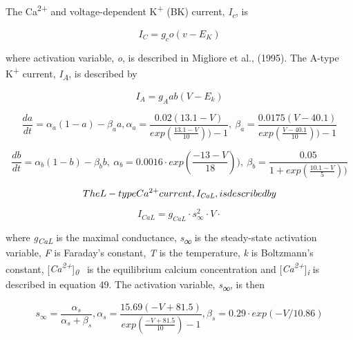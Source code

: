 \documentclass[12pt]{article}
\begin{document}
The Ca\textsuperscript{2+} and voltage-dependent K\textsuperscript{+} (BK) current,
\textit{I}\textit{\textsubscript{c}}, is 


\begin{equation}
I_C=g_co(v-E_K)
\end{equation}


where activation variable, \textit{o}, is described in Migliore et al., (1995). The A-type K\textsuperscript{+} current,
\textit{I}\textit{\textsubscript{A}}, is described by\ \ 


\begin{equation}
I_A=g_A ab (V-E_k)
\end{equation}

\begin{equation}
\frac{da}{dt}=\alpha_a(1-a)-\beta_aa , 
\alpha_a=\frac{0.02(13.1-V)}{exp(\frac{13.1-V}{10}))-1}, \ 
\beta_a=\frac{0.0175(V-40.1)}{exp(\frac{V-40.1}{10}))-1}
\end{equation}

\begin{equation}
\frac{db}{dt}=\alpha_b(1-b)-\beta_bb , \ 
\alpha_b = 0.0016 \cdot exp(\frac{-13-V}{18})), \  \beta_b=\frac{0.05}{1+exp(\frac{10.1-V}{5}))}
\end{equation}

\begin{equation}
The L-type Ca\textsuperscript{2+} current, \textit{I}\textit{\textsubscript{CaL}}, is described by
\end{equation}

\begin{equation}
I_{CaL}=g_{CaL}\cdot s_{\infty }^2\cdot V\cdot
\end{equation}


where \textit{g}\textit{\textsubscript{CaL}} is the maximal conductance, \textit{s}\textsf{\textit{\textsubscript{∞}}}
is the steady-state activation variable, \textit{F} is Faraday’s constant, \textit{T} is the temperature, \textit{k} is
Boltzmann’s constant, [\textit{Ca\textsuperscript{2+}}]\textit{\textsubscript{0}} \ is the
equilibrium calcium concentration and [\textit{Ca}\textit{\textsuperscript{2+}}]\textit{\textsubscript{i}} is
described in equation 49. The activation variable, \textit{s}\textsf{\textit{\textsubscript{∞}}}\textit{,} is then


\begin{equation}
s_{\infty }=\frac{\alpha_s}{\alpha_s+\beta_s} ,  \alpha_s=\frac{15.69(-V+81.5)}{exp(\frac{-V+81.5}{10})-1} ,  
\beta_s=0.29\cdot exp(-V/10.86)
\end{equation}
\end{document}
